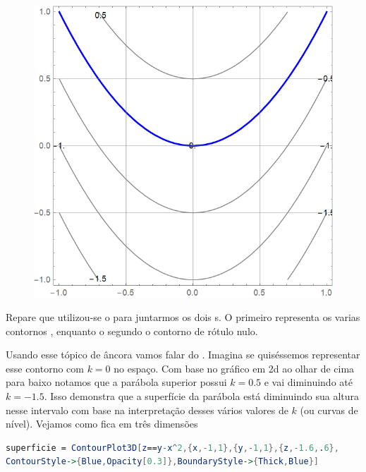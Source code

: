 \documentclass[a4paper, 12pt]{article}
\begin{document}
	\newpage
	\begin{figure}[!h]
		\centering
		\includegraphics[scale=.47]{images/ContourZero}
	\end{figure}

	Repare que utilizou-se o  para juntarmos os dois s. O primeiro representa os varias contornos , enquanto o segundo o contorno de rótulo nulo.
	
	Usando esse tópico de âncora vamos falar do . Imagina se quiséssemos representar esse contorno com $k=0$ no espaço. Com base no gráfico em 2d ao olhar de cima para baixo notamos que a parábola superior possui $k=0.5$ e vai diminuindo até $k=-1.5$. Isso demonstra que a superfície da parábola está diminuindo sua altura nesse intervalo com base na interpretação desses vários valores de $k$ (ou curvas de nível). Vejamos como fica em três dimensões
	
\begin{lstlisting}[language=Mathematica]
superficie = ContourPlot3D[z==y-x^2,{x,-1,1},{y,-1,1},{z,-1.6,.6}, 
ContourStyle->{Blue,Opacity[0.3]},BoundaryStyle->{Thick,Blue}]
\end{lstlisting}
\end{document}
